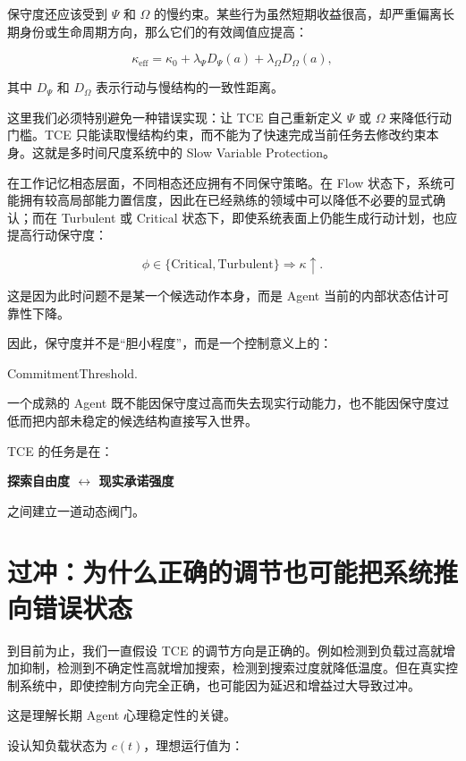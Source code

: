 保守度还应该受到 $\Psi$ 和 $\Omega$ 的慢约束。某些行为虽然短期收益很高，却严重偏离长期身份或生命周期方向，那么它们的有效阈值应提高：

\[
\kappa_{\mathrm{eff}}
=
\kappa_0
+
\lambda_\Psi
D_\Psi(a)
+
\lambda_\Omega
D_\Omega(a),
\]

其中 $D_\Psi$ 和 $D_\Omega$ 表示行动与慢结构的一致性距离。

这里我们必须特别避免一种错误实现：让 TCE 自己重新定义 $\Psi$ 或 $\Omega$ 来降低行动门槛。TCE 只能读取慢结构约束，而不能为了快速完成当前任务去修改约束本身。这就是多时间尺度系统中的 Slow Variable Protection。

在工作记忆相态层面，不同相态还应拥有不同保守策略。在 Flow 状态下，系统可能拥有较高局部能力置信度，因此在已经熟练的领域中可以降低不必要的显式确认；而在 Turbulent 或 Critical 状态下，即使系统表面上仍能生成行动计划，也应提高行动保守度：

\[
\phi\in
\{\mathrm{Critical,Turbulent}\}
\Rightarrow
\kappa\uparrow.
\]

这是因为此时问题不是某一个候选动作本身，而是 Agent 当前的内部状态估计可靠性下降。

因此，保守度并不是“胆小程度”，而是一个控制意义上的：

\begin{statementbox}
CommitmentThreshold.
\end{statementbox}

一个成熟的 Agent 既不能因保守度过高而失去现实行动能力，也不能因保守度过低而把内部未稳定的候选结构直接写入世界。

TCE 的任务是在：

\begin{statementbox}
\centering\bfseries
探索自由度
$\longleftrightarrow$
现实承诺强度
\end{statementbox}

之间建立一道动态阀门。

\section{过冲：为什么正确的调节也可能把系统推向错误状态}

到目前为止，我们一直假设 TCE 的调节方向是正确的。例如检测到负载过高就增加抑制，检测到不确定性高就增加搜索，检测到搜索过度就降低温度。但在真实控制系统中，即使控制方向完全正确，也可能因为延迟和增益过大导致过冲。

这是理解长期 Agent 心理稳定性的关键。

设认知负载状态为 $c(t)$，理想运行值为：

